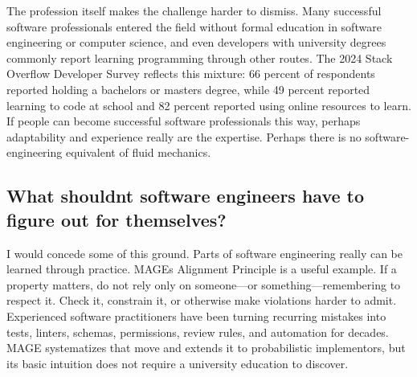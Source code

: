 
The profession itself makes the challenge harder to dismiss. Many successful software professionals entered the field without formal education in software engineering or computer science, and even developers with university degrees commonly report learning programming through other routes. The 2024 Stack Overflow Developer Survey reflects this mixture: 66 percent of respondents reported holding a bachelor\textquotesingle s or master\textquotesingle s degree, while 49 percent reported learning to code at school and 82 percent reported using online resources to learn\citep{stackoverflow2024survey}. If people can become successful software professionals this way, perhaps adaptability and experience really are the expertise. Perhaps there is no software-engineering equivalent of fluid mechanics.

\subsection{What shouldn\textquotesingle t software engineers have to figure out for themselves?}\label{heading:what-shouldnt-software-engineers-have-to-figure-out-for-themselves}


I would concede some of this ground. Parts of software engineering really can be learned through practice. MAGE\textquotesingle s Alignment Principle is a useful example. If a property matters, do not rely only on someone---or something---remembering to respect it. Check it, constrain it, or otherwise make violations harder to admit. Experienced software practitioners have been turning recurring mistakes into tests, linters, schemas, permissions, review rules, and automation for decades. MAGE systematizes that move and extends it to probabilistic implementors, but its basic intuition does not require a university education to discover.


